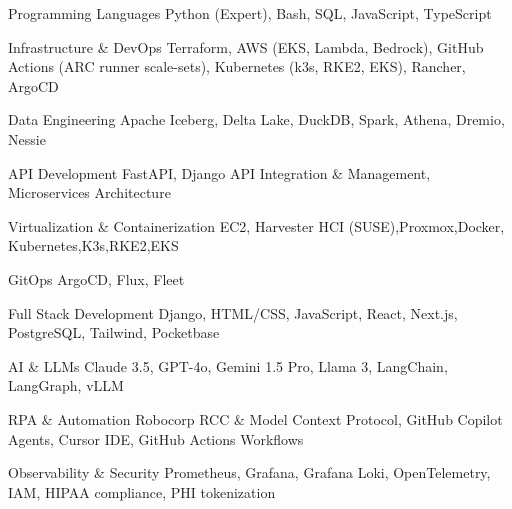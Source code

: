 


\begin{cvskills}


\cvskill
{Programming Languages} %
{Python (Expert), Bash, SQL, JavaScript, TypeScript} %


\cvskill
{Infrastructure \& DevOps} %
{Terraform, AWS (EKS, Lambda, Bedrock), GitHub Actions (ARC runner scale-sets), Kubernetes (k3s, RKE2, EKS), Rancher, ArgoCD} %



\cvskill
{Data Engineering} %
{Apache Iceberg, Delta Lake, DuckDB, Spark, Athena, Dremio, Nessie} %


\cvskill
{API Development} %
{FastAPI, Django API Integration \& Management, Microservices Architecture} %


\cvskill
{Virtualization \& Containerization} %
{EC2, Harvester HCI (SUSE),Proxmox,Docker, Kubernetes,K3s,RKE2,EKS} %


\cvskill
{GitOps} %
{ArgoCD, Flux, Fleet} %


\cvskill
{Full Stack Development} %
{Django, HTML/CSS, JavaScript, React, Next.js, PostgreSQL, Tailwind, Pocketbase} %


\cvskill
{AI \& LLMs} %
{Claude 3.5, GPT-4o, Gemini 1.5 Pro, Llama 3, LangChain, LangGraph, vLLM} %


\cvskill
{RPA \& Automation} %
{Robocorp RCC \& Model Context Protocol, GitHub Copilot Agents, Cursor IDE, GitHub Actions Workflows} %


\cvskill
{Observability \& Security} %
{Prometheus, Grafana, Grafana Loki, OpenTelemetry, IAM, HIPAA compliance, PHI tokenization} %


\end{cvskills}
